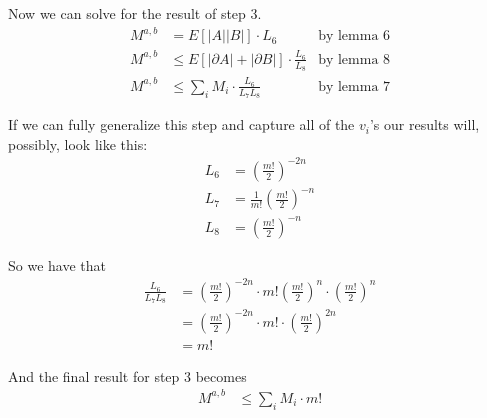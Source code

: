 	Now we can solve for the result of step 3.
	\begin{align*}
		M^{a,b} &= E[|A||B|] \cdot L_6 & \textrm{by lemma 6} \\
		M^{a,b} &\le E[|\partial A| + |\partial B|] \cdot \frac{L_6}{L_8} & \textrm{by lemma 8} \\
		M^{a,b} &\le \sum_i M_i \cdot \frac{L_6}{L_7L_8} & \textrm{by lemma 7}
	\end{align*}

	If we can fully generalize this step and capture all of the $v_i$'s our results will, possibly, look like this:
	\begin{align*}
		L_6 &= \left(\frac{m!}{2}\right)^{-2n} \\
		L_7 &= \frac{1}{m!}\left(\frac{m!}{2}\right)^{-n} \\
		L_8 &= \left(\frac{m!}{2}\right)^{-n}
	\end{align*}

	So we have that
	\begin{align*}
		\frac{L_6}{L_7L_8} &= \left(\frac{m!}{2}\right)^{-2n} \cdot m!\left(\frac{m!}{2}\right)^{n} \cdot \left(\frac{m!}{2}\right)^{n} \\
		&= \left(\frac{m!}{2}\right)^{-2n} \cdot m! \cdot \left(\frac{m!}{2}\right)^{2n} \\
		&= m!
	\end{align*}

	And the final result for step 3 becomes
	\begin{align*}
		M^{a,b} &\le \sum_i M_i \cdot m!
	\end{align*}
